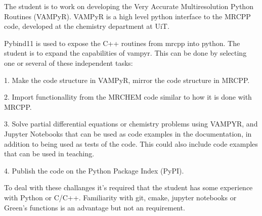 The student is to work on developing the Very Accurate Multiresolution
Python Routines (VAMPyR). VAMPyR is a high level python interface to
the MRCPP code, developed at the chemistry department at UiT.

Pybind11 is used to expose the C++ routines from mrcpp into python.
The student is to expand the capabilities of vampyr. This can be 
done by selecting one or several of these independent tasks:

1. Make the code structure in VAMPyR, mirror the code structure
   in MRCPP.  

2. Import functionallity from the MRCHEM code similar to how it is
   done with MRCPP.

3. Solve partial differential equations or chemistry problems using VAMPYR,
   and Jupyter Notebooks that can be used as code examples in the 
   documentation, in addition to being used as tests of the code.
   This could also include code examples that can be used in 
   teaching. 

4. Publish the code on the Python Package Index (PyPI).

To deal with these challanges it's required that the student 
has some experience with Python or C/C++. Familiarity with
git, cmake, jupyter notebooks or Green's functions is an advantage but not 
an requirement. 

